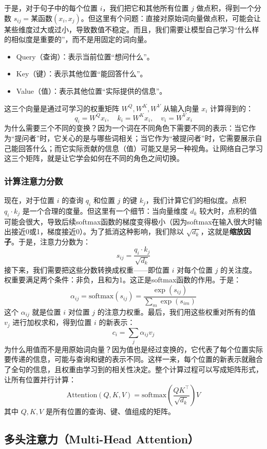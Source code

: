 \documentclass[lang=cn,zihao=-4,a4paper,fontset=windows]{beautybook}
\begin{document}
于是，对于句子中的每个位置 \(i\)，我们把它和其他所有位置 \(j\) 做点积，得到一个分数 \(s_{ij} = \text{某函数}(x_i, x_j)\)。但这里有个问题：直接对原始词向量做点积，可能会让某些维度过大或过小，导致数值不稳定。而且，我们需要让模型自己学习“什么样的相似度是重要的”，而不是用固定的词向量。
\begin{itemize}
\item Query（查询）：表示当前位置“想问什么”。
\item Key（键）：表示其他位置“能回答什么”。
\item Value（值）：表示其他位置“实际提供的信息”。
\end{itemize}
这三个向量是通过可学习的权重矩阵 \(W^Q, W^K, W^V\) 从输入向量 \(x_i\) 计算得到的：
\[
q_i = W^Q x_i,\quad k_i = W^K x_i,\quad v_i = W^V x_i
\]
为什么需要三个不同的变换？因为一个词在不同角色下需要不同的表示：当它作为“提问者”时，它关心的是与哪些词相关；当它作为“被提问者”时，它需要展示自己能回答什么；而它实际贡献的信息（值）可能又是另一种视角。让网络自己学习这三个矩阵，就是让它学会如何在不同的角色之间切换。

\subsubsection*{计算注意力分数}

现在，对于位置 \(i\) 的查询 \(q_i\) 和位置 \(j\) 的键 \(k_j\)，我们计算它们的相似度。点积 \(q_i \cdot k_j\) 是一个合理的度量。但这里有一个细节：当向量维度 \(d_k\) 较大时，点积的值可能会很大，导致后续softmax函数的梯度变得极小（因为softmax在输入很大时输出接近0或1，梯度接近0）。为了抵消这种影响，我们除以 \(\sqrt{d_k}\)，这就是\textbf{缩放因子}。于是，注意力分数为：
\[
s_{ij} = \frac{q_i \cdot k_j}{\sqrt{d_k}}
\]
接下来，我们需要把这些分数转换成权重——即位置 \(i\) 对每个位置 \(j\) 的关注度。权重要满足两个条件：非负，且和为1。这正是softmax函数的作用。于是：
\[
\alpha_{ij} = \text{softmax}(s_{ij}) = \frac{\exp(s_{ij})}{\sum_{m} \exp(s_{im})}
\]
这个 \(\alpha_{ij}\) 就是位置 \(i\) 对位置 \(j\) 的注意力权重。最后，我们用这些权重对所有的值 \(v_j\) 进行加权求和，得到位置 \(i\) 的新表示：
\[
c_i = \sum_j \alpha_{ij} v_j
\]
为什么用值而不是用原始词向量？因为值也是经过变换的，它代表了每个位置实际要传递的信息，可能与查询和键的表示不同。这样一来，每个位置的新表示就融合了全句的信息，且权重由学习到的相关性决定。整个计算过程可以写成矩阵形式，让所有位置并行计算：
\[
\text{Attention}(Q, K, V) = \text{softmax}\left(\frac{QK^\top}{\sqrt{d_k}}\right)V
\]
其中 \(Q, K, V\) 是所有位置的查询、键、值组成的矩阵。


\subsection{多头注意力（Multi-Head Attention）}
\end{document}
